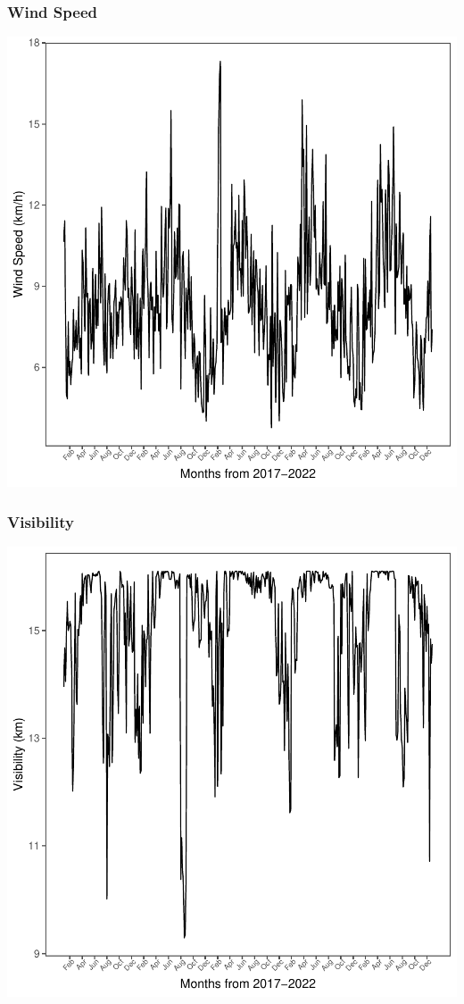 \documentclass[11pt, a4paper]{article}
\begin{document}
\subsubsection{Wind Speed}

\includegraphics{variableinvestigation-039}



\subsubsection{Visibility}

\includegraphics{variableinvestigation-040}
\end{document}
